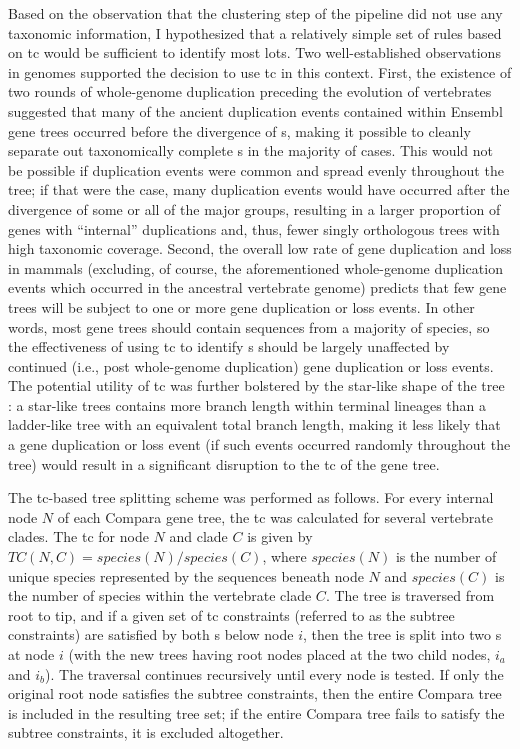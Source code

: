Based on the observation that the clustering step of the \cmp pipeline
did not use any taxonomic information, I hypothesized that a
relatively simple set of rules based on \ac{tc} would be sufficient to
identify most \mammln \acp{lot}. Two well-established observations in
\mammln genomes supported the decision to use \ac{tc} in this
context. First, the existence of two rounds of whole-genome
duplication preceding the evolution of vertebrates \citep{Dehal2005}
suggested that many of the ancient duplication events contained within
Ensembl gene trees occurred before the divergence of \mamml{}s, making
it possible to cleanly separate out taxonomically complete \mammln
\subtr{}s in the majority of cases. This would not be possible if
duplication events were common and spread evenly throughout the
\mammln tree; if that were the case, many duplication events would
have occurred after the divergence of some or all of the major \mammln
groups, resulting in a larger proportion of \mammln genes with
``internal'' duplications and, thus, fewer singly orthologous trees
with high taxonomic coverage. Second, the overall low rate of gene
duplication and loss in mammals \citep{Demuth2006} (excluding, of
course, the aforementioned whole-genome duplication events which
occurred in the ancestral vertebrate genome) predicts that few \mammln
gene trees will be subject to one or more gene duplication or loss
events. In other words, most \mammln gene trees should contain
sequences from a majority of \mammln species, so the effectiveness of
using \ac{tc} to identify \mammln \subtr{}s should be largely
unaffected by continued (i.e., post whole-genome duplication) gene
duplication or loss events. The potential utility of \ac{tc} was
further bolstered by the star-like shape of the \mammln tree
\citep{BinindaEmonds2007}: a star-like trees contains more branch
length within terminal lineages than a ladder-like tree with an
equivalent total branch length, making it less likely that a gene
duplication or loss event (if such events occurred randomly throughout
the \mammln tree) would result in a significant disruption to the
\ac{tc} of the gene tree.

The \ac{tc}-based tree splitting scheme was performed as
follows. For every internal node $N$ of each Compara gene tree, the
\ac{tc} was calculated for several vertebrate clades. The \ac{tc} for
node $N$ and clade $C$ is given by $TC(N,C) = species(N) / species(C)
$, where $species(N)$ is the number of unique species represented by
the sequences beneath node $N$ and $species(C)$ is the number of
species within the vertebrate clade $C$. The tree is traversed from
root to tip, and if a given set of \ac{tc} constraints (referred to as
the subtree constraints) are satisfied by both \subtr{}s below node
$i$, then the tree is split into two \subtr{}s at node $i$ (with the
new trees having root nodes placed at the two child nodes, $i_a$ and
$i_b$). The traversal continues recursively until every node is
tested. If only the original root node satisfies the subtree
constraints, then the entire Compara tree is included in the resulting
tree set; if the entire Compara tree fails to satisfy the subtree
constraints, it is excluded altogether.

